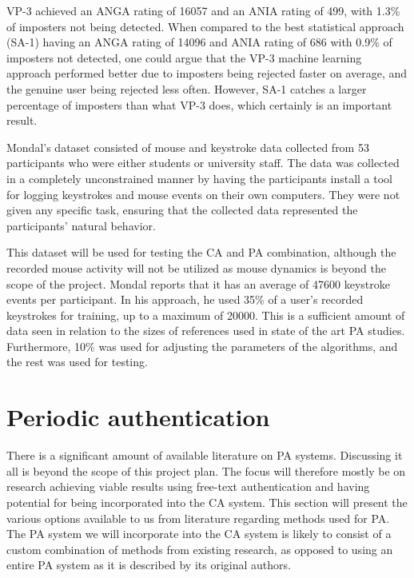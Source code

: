 \documentclass[informationsecurity]{gucmasterproject}
\begin{document}
VP-3 achieved an ANGA rating of 16057 and an ANIA rating of 499, with 1.3\% of imposters not being detected.
When compared to the best statistical approach (SA-1) having an ANGA rating of 14096 and ANIA rating of 686 with 0.9\% of imposters not detected, one could argue that the VP-3 machine learning approach performed better due to imposters being rejected faster on average, and the genuine user being rejected less often.
However, SA-1 catches a larger percentage of imposters than what VP-3 does, which certainly is an important result.

Mondal's dataset consisted of mouse and keystroke data collected from 53 participants who were either students or university staff.
The data was collected in a completely unconstrained manner by having the participants install a tool for logging keystrokes and mouse events on their own computers.
They were not given any specific task, ensuring that the collected data represented the participants' natural behavior.

This dataset will be used for testing the CA and PA combination, although the recorded mouse activity will not be utilized as mouse dynamics is beyond the scope of the project.
Mondal reports that it has an average of 47600 keystroke events per participant. 
In his approach, he used 35\% of a user's recorded keystrokes for training, up to a maximum of 20000.
This is a sufficient amount of data seen in relation to the sizes of references used in state of the art PA studies.
Furthermore, 10\% was used for adjusting the parameters of the algorithms, and the rest was used for testing.


\section{Periodic authentication}
\label{sec:related-other}
There is a significant amount of available literature on PA systems.
Discussing it all is beyond the scope of this project plan. The focus will therefore mostly be on research achieving viable results using free-text authentication and having potential for being incorporated into the CA system.
This section will present the various options available to us from literature regarding methods used for PA.
The PA system we will incorporate into the CA system is likely to consist of a custom combination of methods from existing research, as opposed to using an entire PA system as it is described by its original authors.
\end{document}
